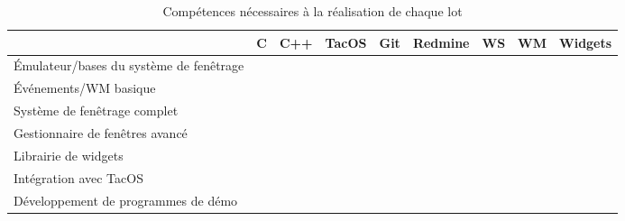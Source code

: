 \begin{table}[h]
\centering
\begin{tabular}{|l|c|c|c|c|c|c|c|c|}
  \rowcolor{dark_grey} \hline &  C & C++ & TacOS & Git & Redmine & WS & WM & Widgets \\
  \hline
  Émulateur/bases du système de fenêtrage & \cellcolor[gray]{0} & \cellcolor[gray]{0.5} & \cellcolor[gray]{0} & \cellcolor[gray]{0.9} & \cellcolor[gray]{0.9} & \cellcolor[gray]{0} & \ \cellcolor[gray]{1} & \cellcolor[gray]{1} \\
  \hline
  Événements/WM basique & \cellcolor[gray]{0.75} & \cellcolor[gray]{0.25} & \cellcolor[gray]{1} & \cellcolor[gray]{0.9} & \cellcolor[gray]{0.9} & \cellcolor[gray]{0.25} & \ \cellcolor[gray]{0.5} & \cellcolor[gray]{1} \\
  \hline
  Système de fenêtrage complet & \cellcolor[gray]{0.5} & \cellcolor[gray]{0.25} & \cellcolor[gray]{1} & \cellcolor[gray]{0.9} & \cellcolor[gray]{0.9} & \cellcolor[gray]{0} & \ \cellcolor[gray]{0.75} & \cellcolor[gray]{1} \\
  \hline
  Gestionnaire de fenêtres avancé & \cellcolor[gray]{1} & \cellcolor[gray]{0} & \cellcolor[gray]{1} & \cellcolor[gray]{0.9} & \cellcolor[gray]{0.9} & \cellcolor[gray]{0.75} & \ \cellcolor[gray]{0} & \cellcolor[gray]{1} \\
  \hline
  Librairie de widgets & \cellcolor[gray]{1} & \cellcolor[gray]{0} & \cellcolor[gray]{1} & \cellcolor[gray]{0.9} & \cellcolor[gray]{0.9} & \cellcolor[gray]{1} & \ \cellcolor[gray]{1} & \cellcolor[gray]{0} \\
  \hline
  Intégration avec TacOS & \cellcolor[gray]{0} & \cellcolor[gray]{1} & \cellcolor[gray]{0} & \cellcolor[gray]{0.9} & \cellcolor[gray]{0.9} & \cellcolor[gray]{1} & \ \cellcolor[gray]{1} & \cellcolor[gray]{1} \\
  \hline
  Développement de programmes de démo & \cellcolor[gray]{1} & \cellcolor[gray]{0.5} & \cellcolor[gray]{1} & \cellcolor[gray]{0.9} & \cellcolor[gray]{0.9} & \cellcolor[gray]{1} & \ \cellcolor[gray]{1} & \cellcolor[gray]{0.25} \\
  \hline
\end{tabular}
\caption{Compétences nécessaires à la réalisation de chaque lot}
\end{table}
